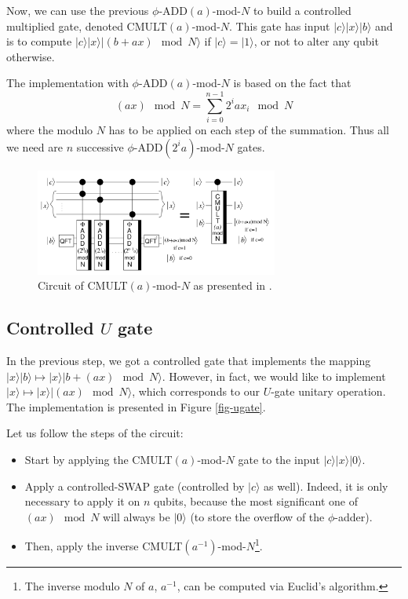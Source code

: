 \documentclass[a4paper, 10pt]{article}
\numberwithin{equation}{section}
\numberwithin{figure}{section}
\numberwithin{table}{section}
\begin{document}
Now, we can use the previous $\phi$-ADD$(a)$-mod-$N$ to build a controlled multiplied gate, denoted CMULT$(a)$-mod-$N$. This gate has input $|c\rangle|x\rangle|b\rangle$ and is to compute $|c\rangle|x\rangle|(b+ax)\mod N\rangle$ if $|c\rangle=|1\rangle$, or not to alter any qubit otherwise.

The implementation with $\phi$-ADD$(a)$-mod-$N$ is based on the fact that
\begin{equation}
	(ax) \mod N = \sum_{i=0}^{n-1}2^{i}ax_i \mod N
\end{equation}
where the modulo $N$ has to be applied on each step of the summation. Thus all we need are $n$ successive $\phi$-ADD$(2^i a)$-mod-$N$ gates.

\begin{figure}[h!]
	\centering
	\includegraphics[width=8cm]{Figures/cmult}
	\caption{Circuit of CMULT$(a)$-mod-$N$ as presented in \cite{beauregard}.}
	\label{fig-cmult}
\end{figure}

\subsection{Controlled $U$ gate}

In the previous step, we got a controlled gate that implements the mapping $|x\rangle|b\rangle \mapsto |x\rangle|b+(ax)\mod N\rangle$. However, in fact, we would like to implement $|x\rangle \mapsto |x\rangle|(ax)\mod N\rangle$, which corresponds to our $U$-gate unitary operation. The implementation is presented in Figure \ref{fig-ugate}.

Let us follow the steps of the circuit:
\begin{itemize}
	\item Start by applying the CMULT$(a)$-mod-$N$ gate to the input $|c\rangle|x\rangle|0\rangle$.
	\item Apply a controlled-SWAP gate (controlled by $|c\rangle$ as well). Indeed, it is only necessary to apply it on $n$ qubits, because the most significant one of $(ax) \mod N$ will always be $|0\rangle$ (to store the overflow of the $\phi$-adder).
	\item Then, apply the inverse CMULT$(a^{-1})$-mod-$N$\footnote{The inverse modulo $N$ of $a$, $a^{-1}$, can be computed via Euclid's algorithm.}.
\end{itemize}
\end{document}
